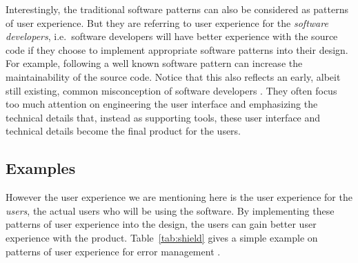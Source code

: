\documentclass{acm_proc_article-sp}
\begin{document}
Interestingly, the traditional software patterns can also be
considered as patterns of user experience. But they are referring to
user experience for the \textit{software developers}, i.e.\ software
developers will have better experience with the source code if they
choose to implement appropriate software patterns into their
design. For example, following a well known software pattern can
increase the maintainability of the source code. Notice that this also
reflects an early, albeit still existing, common misconception of
software developers \citep{pux:blackwell}. They often focus too much
attention on engineering the user interface and emphasizing the
technical details that, instead as supporting tools, these user
interface and technical details become the final product for the
users.

\subsection{Examples}
However the user experience we are mentioning here is the user
experience for the \textit{users}, the actual users who will be using
the software. By implementing these patterns of user experience into
the design, the users can gain better user experience with the
product. Table~\ref{tab:shield} gives a simple example on patterns of
user experience for error management \citep{patterns:welie}.
\end{document}
